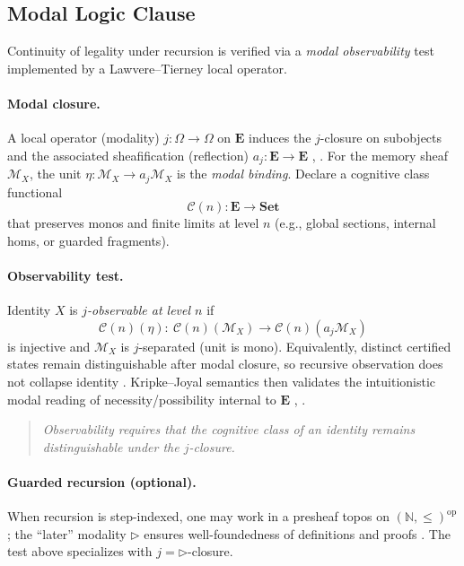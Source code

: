 \documentclass[12pt]{amsart}
\theoremstyle{plain}
\begin{document}
\subsection{Modal Logic Clause}

Continuity of legality under recursion is verified via a \emph{modal observability} test implemented by a Lawvere–Tierney local operator.

\paragraph{Modal closure.}
A local operator (modality) $j:\Omega\!\to\!\Omega$ on $\mathbf{E}$ induces the $j$-closure on subobjects and the associated sheafification (reflection) $a_j:\mathbf{E}\!\to\!\mathbf{E}$ \cite[VI.8]{maclane1992sheaves}, \cite[C1]{johnstone2002elephant}. For the memory sheaf $\mathscr{M}_X$, the unit $\eta:\mathscr{M}_X\to a_j\mathscr{M}_X$ is the \emph{modal binding}. Declare a cognitive class functional
\[
\mathcal{C}(n):\mathbf{E}\longrightarrow \mathbf{Set}
\]
that preserves monos and finite limits at level $n$ (e.g., global sections, internal homs, or guarded fragments).

\paragraph{Observability test.}
Identity $X$ is \emph{$j$-observable at level $n$} if
\[
\mathcal{C}(n)(\eta):\ \mathcal{C}(n)(\mathscr{M}_X)\longrightarrow \mathcal{C}(n)(a_j\mathscr{M}_X)
\]
is injective and $\mathscr{M}_X$ is $j$-separated (unit is mono). Equivalently, distinct certified states remain distinguishable after modal closure, so recursive observation does not collapse identity \cite{maclane1992sheaves,awodey2004topos}. Kripke–Joyal semantics then validates the intuitionistic modal reading of necessity/possibility internal to $\mathbf{E}$ \cite[VI]{maclane1992sheaves}, \cite{johnstone2002elephant}.

\begin{quote}
\textit{Observability requires that the cognitive class of an identity remains distinguishable under the $j$-closure.}
\end{quote}

\paragraph{Guarded recursion (optional).}
When recursion is step-indexed, one may work in a presheaf topos on $(\mathbb{N},\le)^{\mathrm{op}}$; the “later” modality $\triangleright$ ensures well-foundedness of definitions and proofs \cite{birkedal2013guarded}. The test above specializes with $j=\triangleright$-closure.
\end{document}
